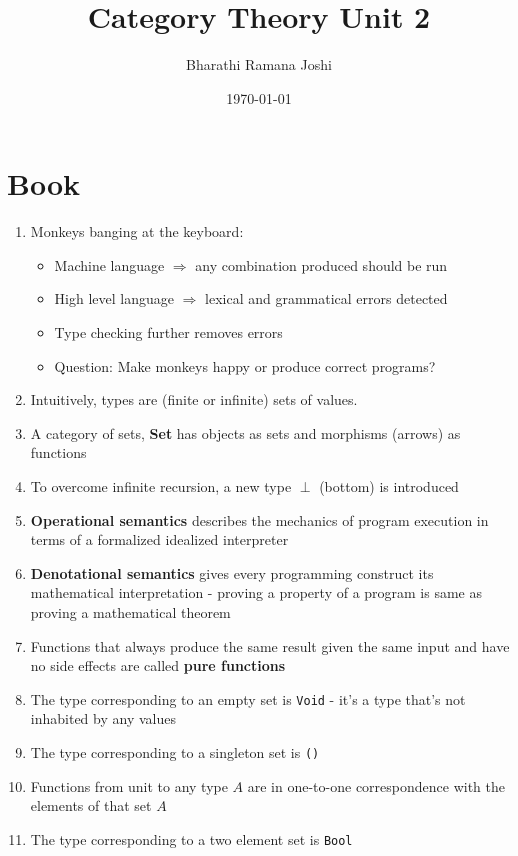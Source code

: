 \documentclass[titlepage, 12pt]{article}
\begin{document}
\title{Category Theory Unit 2}

\author{Bharathi Ramana Joshi}

\date{\today}

\maketitle

\newpage

\section{Book}
\begin{enumerate}
	\item Monkeys banging at the keyboard:
		\begin{itemize}
			\item Machine language $\Rightarrow$ any combination produced should be run
			\item High level language $\Rightarrow$ lexical and grammatical errors detected
			\item Type checking further removes errors
			\item Question: Make monkeys happy or produce correct programs?
		\end{itemize}
	\item Intuitively, types are (finite or infinite) sets of values.
	\item A category of sets, \textbf{Set} has objects as sets and morphisms
		(arrows) as functions
	\item To overcome infinite recursion, a new type $\perp$ (bottom) is introduced
	\item \textbf{Operational semantics} describes the mechanics of program execution in
		terms of a formalized idealized interpreter
	\item \textbf{Denotational semantics} gives every programming construct its
		mathematical interpretation - proving a property of a program is same as
		proving a mathematical theorem
	\item Functions that always produce the same result given the same input and
		have no side effects are called \textbf{pure functions}
	\item The type corresponding to an empty set is \lstinline{Void} - it's a
		type that's not inhabited by any values
	\item The type corresponding to a singleton set is \lstinline{()}
	\item Functions from unit to any type $A$ are in one-to-one correspondence
		with the elements of that set $A$
	\item The type corresponding to a two element set is \lstinline{Bool}
\end{enumerate}
\end{document}
